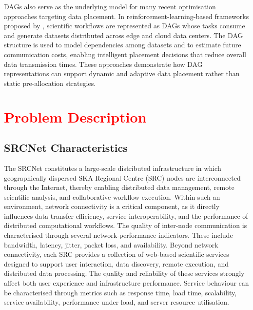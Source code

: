 \documentclass[a4paper,fleqn]{cas-dc}
\begin{document}
DAGs also serve as the underlying model for many recent optimisation approaches targeting data placement. In reinforcement-learning-based frameworks proposed by \citealt{du2022scientific}, scientific workflows are represented as DAGs whose tasks consume and generate datasets distributed across edge and cloud data centers. The DAG structure is used to model dependencies among datasets and to estimate future communication costs, enabling intelligent placement decisions that reduce overall data transmission times. These approaches demonstrate how DAG representations can support dynamic and adaptive data placement rather than static pre-allocation strategies.




\section{\textcolor{red}{Problem Description}}
\label{description}

\subsection{SRCNet Characteristics}

The SRCNet constitutes a large-scale distributed infrastructure in which geographically dispersed SKA Regional Centre (SRC) nodes are interconnected through the Internet, thereby enabling distributed data management, remote scientific analysis, and collaborative workflow execution. Within such an environment, network connectivity is a critical component, as it directly influences data-transfer efficiency, service interoperability, and the performance of distributed computational workflows. The quality of inter-node communication is characterised through several network-performance indicators. These include bandwidth, latency, jitter, packet loss, and availability. Beyond network connectivity, each SRC provides a collection of web-based scientific services designed to support user interaction, data discovery, remote execution, and distributed data processing. The quality and reliability of these services strongly affect both user experience and infrastructure performance. Service behaviour can be characterised through metrics such as response time, load time, scalability, service availability, performance under load, and server resource utilisation. 
\end{document}
